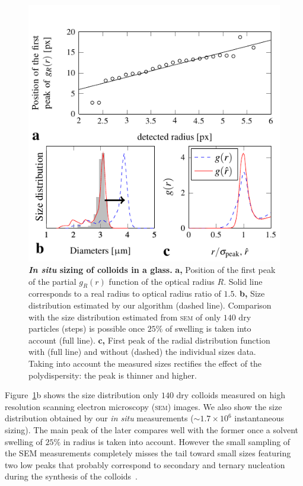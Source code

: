 \documentclass[8.5pt,twoside,twocolumn]{article}
\begin{document}
\begin{figure}
\centering
\includegraphics{fig_sizing.pdf}
	\caption{\textbf{\emph{In situ} sizing of colloids in a glass.} \textbf{a,} Position of the first peak of the partial $g_R(r)$ function of the optical radius $R$. Solid line corresponds to a real radius to optical radius ratio of $1.5$. \textbf{b,} Size distribution estimated by our algorithm (dashed line). Comparison with the size distribution estimated from \textsc{sem} of only $140$ dry particles (steps) is possible once $25\%$ of swelling is taken into account (full line). \textbf{c,} First peak of the radial distribution function with (full line) and without (dashed) the individual sizes data. Taking into account the measured sizes rectifies the effect of the polydispersity: the peak is thinner and higher.}
	\label{fig:sizing}
\end{figure}

Figure~\ref{fig:sizing}b shows the size distribution only $140$ dry colloids measured on high resolution scanning electron microscopy (\textsc{sem}) images. We also show the size distribution obtained by our \emph{in situ} measurements ($\sim 1.7\times 10^6$ instantaneous sizing). The main peak of the later compares well with the former once a solvent swelling of $25\%$ in radius is taken into account. However the small sampling of the SEM measurements completely misses the tail toward small sizes featuring two low peaks that probably correspond to secondary and ternary nucleation during the synthesis of the colloids~\cite{bosma2002,Poon2012}.
\end{document}
